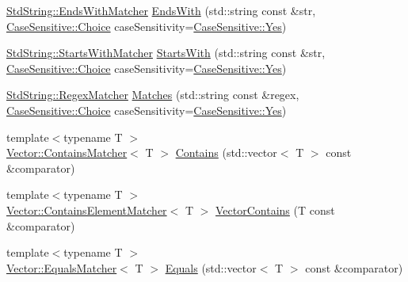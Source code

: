 \begin{DoxyCompactItemize}
\item 
\mbox{\hyperlink{struct_catch_1_1_matchers_1_1_std_string_1_1_ends_with_matcher}{Std\+String\+::\+Ends\+With\+Matcher}} \mbox{\hyperlink{namespace_catch_1_1_matchers_ae5a45efb4538c57c43e04f3f9043ad6e}{Ends\+With}} (std\+::string const \&str, \mbox{\hyperlink{struct_catch_1_1_case_sensitive_aad49d3aee2d97066642fffa919685c6a}{Case\+Sensitive\+::\+Choice}} case\+Sensitivity=\mbox{\hyperlink{struct_catch_1_1_case_sensitive_aad49d3aee2d97066642fffa919685c6aa7c5550b69ec3c502e6f609b67f9613c6}{Case\+Sensitive\+::\+Yes}})
\item 
\mbox{\hyperlink{struct_catch_1_1_matchers_1_1_std_string_1_1_starts_with_matcher}{Std\+String\+::\+Starts\+With\+Matcher}} \mbox{\hyperlink{namespace_catch_1_1_matchers_a97c9ee09a70378ca7e8c6f9f01b0d6d1}{Starts\+With}} (std\+::string const \&str, \mbox{\hyperlink{struct_catch_1_1_case_sensitive_aad49d3aee2d97066642fffa919685c6a}{Case\+Sensitive\+::\+Choice}} case\+Sensitivity=\mbox{\hyperlink{struct_catch_1_1_case_sensitive_aad49d3aee2d97066642fffa919685c6aa7c5550b69ec3c502e6f609b67f9613c6}{Case\+Sensitive\+::\+Yes}})
\item 
\mbox{\hyperlink{struct_catch_1_1_matchers_1_1_std_string_1_1_regex_matcher}{Std\+String\+::\+Regex\+Matcher}} \mbox{\hyperlink{namespace_catch_1_1_matchers_a82f1893cf50ae4c14b9b3e0980bf22b8}{Matches}} (std\+::string const \&regex, \mbox{\hyperlink{struct_catch_1_1_case_sensitive_aad49d3aee2d97066642fffa919685c6a}{Case\+Sensitive\+::\+Choice}} case\+Sensitivity=\mbox{\hyperlink{struct_catch_1_1_case_sensitive_aad49d3aee2d97066642fffa919685c6aa7c5550b69ec3c502e6f609b67f9613c6}{Case\+Sensitive\+::\+Yes}})
\item 
{\footnotesize template$<$typename T $>$ }\\\mbox{\hyperlink{struct_catch_1_1_matchers_1_1_vector_1_1_contains_matcher}{Vector\+::\+Contains\+Matcher}}$<$ T $>$ \mbox{\hyperlink{namespace_catch_1_1_matchers_a4b3621740dc515216ad31ab827d4092c}{Contains}} (std\+::vector$<$ T $>$ const \&comparator)
\item 
{\footnotesize template$<$typename T $>$ }\\\mbox{\hyperlink{struct_catch_1_1_matchers_1_1_vector_1_1_contains_element_matcher}{Vector\+::\+Contains\+Element\+Matcher}}$<$ T $>$ \mbox{\hyperlink{namespace_catch_1_1_matchers_ae8db5846328116fb36386893deaec944}{Vector\+Contains}} (T const \&comparator)
\item 
{\footnotesize template$<$typename T $>$ }\\\mbox{\hyperlink{struct_catch_1_1_matchers_1_1_vector_1_1_equals_matcher}{Vector\+::\+Equals\+Matcher}}$<$ T $>$ \mbox{\hyperlink{namespace_catch_1_1_matchers_a332a401fb0da33c988e9cfa400ecce1b}{Equals}} (std\+::vector$<$ T $>$ const \&comparator)

\end{DoxyCompactItemize}
